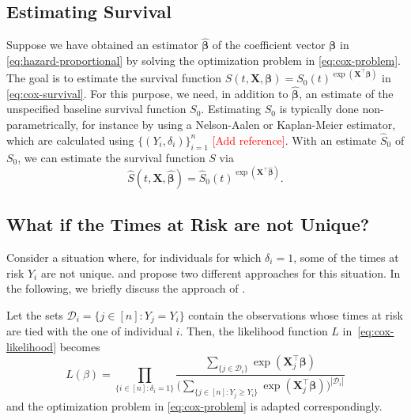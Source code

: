 \documentclass[11pt]{article}
\newcommand{\X}{\mathbf{X}}
\renewcommand{\b}{\bm{\beta}}
\begin{document}
\subsection{Estimating Survival}
Suppose we have obtained an estimator $\widehat{\b}$ of the coefficient vector $\b$ in \eqref{eq:hazard-proportional} by solving the optimization problem in \eqref{eq:cox-problem}. The goal is to estimate the survival function $S(t, \X, \b) = S_0(t)^{\exp(\X^\top \b)}$ in \eqref{eq:cox-survival}. For this purpose, we need, in addition to $\widehat{\b}$, an estimate of the unspecified baseline survival function $S_0$. Estimating $S_0$ is typically done non-parametrically, for instance by using a Nelson-Aalen or Kaplan-Meier estimator, which are calculated using $\{( Y_i, \delta_i )\}_{i=1}^n$ \textcolor{red}{[Add reference]}. With an estimate $\widehat{S}_0$ of $S_0$, we can estimate the survival function $S$ via 
\[
	\widehat{S}(t, \X, \widehat{\b}) = \widehat{S}_0(t)^{\exp(\X^\top \widehat{\b})}.
\]




\subsection{What if the Times at Risk are not Unique?} \label{sec:non-unique-times}
Consider a situation where, for individuals for which $\delta_i = 1$, some of the times at risk $Y_i$ are not unique. \cite{breslow1975} and \cite{efron1977} propose two different approaches for this situation. In the following, we briefly discuss the approach of \cite{breslow1975}.

Let the sets $\mathcal{D}_i = \{ j \in [n] : Y_j = Y_i \}$ contain the observations whose times at risk are tied with the one of individual $i$. Then, the likelihood function $L$ in~\eqref{eq:cox-likelihood} becomes
\begin{equation*} 
        L(\beta)
        =
        \prod_{\{ i \in [n] : \delta_i = 1 \}}
        \frac{ \sum_{\{j\in \mathcal{D}_i\}}\exp(\X_j^\top \b) }{ \Big( \sum_{\{ j\in[n] : Y_j \geq Y_i \}} \exp(\X_j^\top \b) \Big)^{|\mathcal{D}_i|} }
\end{equation*}
and the optimization problem in \eqref{eq:cox-problem} is adapted correspondingly.
\end{document}
